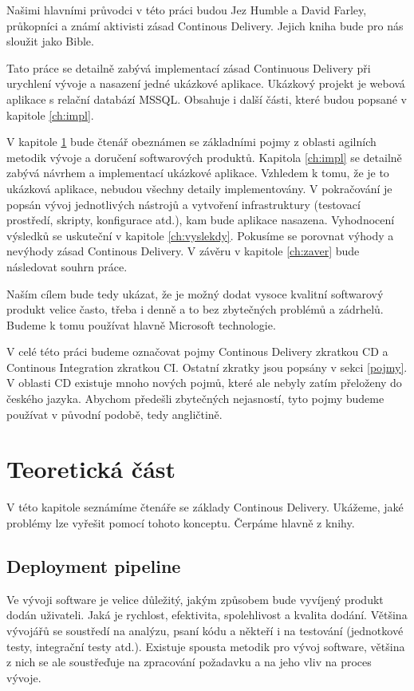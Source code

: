 Našimi hlavními průvodci v této práci budou Jez Humble a David Farley, průkopníci a známí aktivisti zásad Continous Delivery. Jejich kniha \cite{ContDelivery} bude pro nás sloužit jako Bible. 

Tato práce se detailně zabývá implementací zásad Continuous Delivery při urychlení vývoje a nasazení jedné ukázkové aplikace. Ukázkový projekt je webová aplikace s relační databází MSSQL. Obsahuje i další části, které budou popsané v kapitole \ref{ch:impl}. 

V kapitole \ref{ch:teorie} bude čtenář obeznámen se základními pojmy z oblasti agilních metodik vývoje a doručení softwarových produktů. Kapitola \ref{ch:impl} se detailně zabývá návrhem a implementací ukázkové aplikace. Vzhledem k tomu, že je to ukázková aplikace, nebudou všechny detaily implementovány. V pokračování je popsán vývoj jednotlivých nástrojů a vytvoření infrastruktury (testovací prostředí, skripty, konfigurace atd.), kam bude aplikace nasazena. Vyhodnocení výsledků se uskuteční v kapitole \ref{ch:vyslekdy}. Pokusíme se porovnat výhody a nevýhody zásad Continous Delivery. V závěru v kapitole \ref{ch:zaver} bude následovat souhrn práce.

Naším cílem bude tedy ukázat, že je možný dodat vysoce kvalitní softwarový produkt velice často, třeba i denně a to bez zbytečných problémů a zádrhelů. Budeme k tomu používat hlavně Microsoft technologie.

V celé této práci budeme označovat pojmy Continous Delivery zkratkou CD a Continous Integration zkratkou CI. Ostatní zkratky jsou popsány v sekci \ref{pojmy}. V oblasti CD existuje mnoho nových pojmů, které ale nebyly zatím přeloženy do českého jazyka. Abychom předešli zbytečných nejasností, tyto pojmy budeme používat v původní podobě, tedy angličtině.

\chapter{Teoretická část}
\label{ch:teorie}
V této kapitole seznámíme čtenáře se základy Continous Delivery. Ukážeme, jaké problémy lze vyřešit pomocí tohoto konceptu. Čerpáme hlavně z knihy\cite{ContDelivery}.

\section{Deployment pipeline}
Ve vývoji software je velice důležitý, jakým způsobem bude vyvíjený produkt dodán uživateli. Jaká je rychlost, efektivita, spolehlivost a kvalita dodání. Většina vývojářů se soustředí na analýzu, psaní kódu a někteří i na testování (jednotkové testy, integrační testy atd.).
Existuje spousta metodik pro vývoj software, většina z nich se ale  soustřeďuje na zpracování požadavku a na jeho vliv na proces vývoje.

